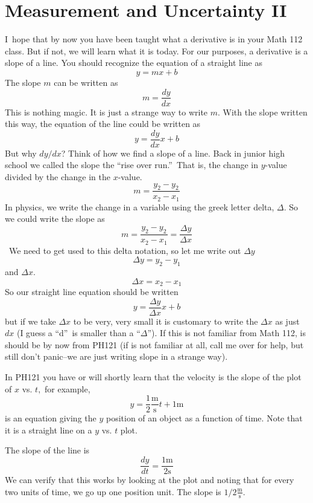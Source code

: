 \documentclass{book}
\begin{document}
\chapter{Measurement and Uncertainty II}

I\ hope that by now you have been taught what a derivative is in your Math 112
class. But if not, we will learn what it is today. For our purposes, a
derivative is a slope of a line. You should recognize the equation of a
straight line as
\[
y=mx+b
\]
The slope $m$ can be written as
\[
m=\frac{dy}{dx}
\]
This is nothing magic. It is just a strange way to write $m.$ With the slope
written this way, the equation of the line could be written as
\[
y=\frac{dy}{dx}x+b
\]
But why $dy/dx$? Think of how we find a slope of a line. Back in junior high
school we called the slope the \textquotedblleft rise over
run.\textquotedblright\ That is, the change in $y$-value divided by the change
in the $x$-value.
\[
m=\frac{y_{2}-y_{2}}{x_{2}-x_{1}}
\]
In physics, we write the change in a variable using the greek letter delta,
$\Delta.$ So we could write the slope as
\[
m=\frac{y_{2}-y_{2}}{x_{2}-x_{1}}=\frac{\Delta y}{\Delta x}
\]
\ We need to get used to this delta notation, so let me write out $\Delta y$
\[
\Delta y=y_{2}-y_{1}
\]
and $\Delta x.$
\[
\Delta x=x_{2}-x_{1}
\]
So our straight line equation should be written
\[
y=\frac{\Delta y}{\Delta x}x+b
\]
but if we take $\Delta x$ to be very, very small it is customary to write the
$\Delta x$ as just $dx$ (I guess a \textquotedblleft d\textquotedblright\ is
smaller than a \textquotedblleft$\Delta$\textquotedblright). If this is not
familiar from Math 112, is should be by now from PH121 (if is not familiar at
all, call me over for help, but still don't panic--we are just writing slope
in a strange way).

In PH121 you have or will shortly learn that the velocity is the slope of the
plot of $x$ vs. $t,$ for example,
\[
y=\frac{1}{2}\frac{\text{m}}{\text{s}}t+1\text{m}
\]
is an equation giving the $y$ position of an object as a function of time.
Note that it is a straight line on a $y$ vs. $t$ plot.
\begin{center}
\end{center}
The slope of the line is
\[
\frac{dy}{dt}=\frac{1
\text{m}
}{2
\text{s}
}
\]
We can verify that this works by looking at the plot and noting that for every
two units of time, we go up one position unit. The slope is $1/2\frac{
\text{m}
}{
\text{s}
}.$
\end{document}
